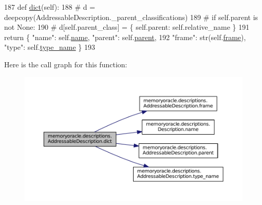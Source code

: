 \begin{DoxyCode}
187     \textcolor{keyword}{def }\hyperlink{classmemoryoracle_1_1descriptions_1_1AddressableDescription_a37c8fe09ba97c170b1c742cdb8ccce0d}{dict}(self):
188         \textcolor{comment}{# d = deepcopy(AddressableDescription.\_parent\_classifications)}
189         \textcolor{comment}{# if self.parent is not None:}
190         \textcolor{comment}{#     d[self.parent\_class] = \{ self.parent: self.relative\_name \}}
191         \textcolor{keywordflow}{return} \{ \textcolor{stringliteral}{"name"}: self.\hyperlink{classmemoryoracle_1_1descriptions_1_1Description_a4b27c3ae1ef0ab35ec0f990fa553b8b3}{name}, \textcolor{stringliteral}{"parent"}: self.\hyperlink{classmemoryoracle_1_1descriptions_1_1AddressableDescription_ae3227952e6fe71fef67246da632126ce}{parent},
192                 \textcolor{stringliteral}{"frame"}: str(self.\hyperlink{classmemoryoracle_1_1descriptions_1_1AddressableDescription_ae2990546319af984b6fca1e78d854117}{frame}), \textcolor{stringliteral}{"type"}: self.\hyperlink{classmemoryoracle_1_1descriptions_1_1AddressableDescription_a7034b0f70e1481cd1dcdfe40bbc20964}{type\_name} \}
193 
\end{DoxyCode}


Here is the call graph for this function\+:\nopagebreak
\begin{figure}[H]
\begin{center}
\leavevmode
\includegraphics[width=350pt]{classmemoryoracle_1_1descriptions_1_1AddressableDescription_a37c8fe09ba97c170b1c742cdb8ccce0d_cgraph}
\end{center}
\end{figure}


\hypertarget{classmemoryoracle_1_1descriptions_1_1AddressableDescription_ae2990546319af984b6fca1e78d854117}{}
